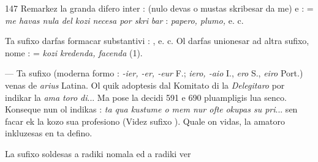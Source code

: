 \begin{VUpage}[151]{147}
Remarkez la granda difero inter : \cc
{} (nulo devas o mustas skribesar da me) e : \nl
{} = \textit{me havas nula del kozi necesa por skri}\cc
\textit{bar} : \textit{papero, plumo,} e. c.

Ta sufixo darfas formacar substantivi : \cc
{}, e. c. Ol darfas unionesar ad altra sufixo, nome\nl
{} :  = \textit{kozi kredenda, facenda} (1).

 --- Ta sufixo (moderna formo : \textit{-ier, -er, -eur} F.;\nl
\textit{iero, -aio} I., \textit{ero} S., \textit{eiro} Port.) venas de \textit{arius} Latina. Ol quik\nl
adoptesis dal Komitato di la \textit{Delegitaro} por indikar la \textit{ama}\cc
\textit{toro di}... Ma pose la decidi 591 e 690 pluampligis lua senco.\nl
Konseque nun ol indikas : \textit{ta qua kustume o mem nur ofte}\nl
\textit{okupas su pri}... sen facar ek la kozo sua profesiono (Videz\nl
sufixo ). Quale on vidas, la amatoro inkluzesas en ta\nl
defino.

La sufixo  soldesas a radiki nomala ed a radiki ver\cc
\end{VUpage}


